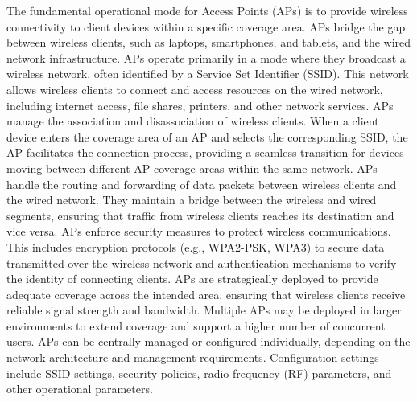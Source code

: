 \documentclass{article}
\begin{document}
	The fundamental operational mode for Access Points (APs) is to provide wireless connectivity to client devices within a specific coverage area. APs bridge the gap between wireless clients, such as laptops, smartphones, and tablets, and the wired network infrastructure. APs operate primarily in a mode where they broadcast a wireless network, often identified by a Service Set Identifier (SSID). This network allows wireless clients to connect and access resources on the wired network, including internet access, file shares, printers, and other network services. APs manage the association and disassociation of wireless clients. When a client device enters the coverage area of an AP and selects the corresponding SSID, the AP facilitates the connection process, providing a seamless transition for devices moving between different AP coverage areas within the same network. APs handle the routing and forwarding of data packets between wireless clients and the wired network. They maintain a bridge between the wireless and wired segments, ensuring that traffic from wireless clients reaches its destination and vice versa. APs enforce security measures to protect wireless communications. This includes encryption protocols (e.g., WPA2-PSK, WPA3) to secure data transmitted over the wireless network and authentication mechanisms to verify the identity of connecting clients. APs are strategically deployed to provide adequate coverage across the intended area, ensuring that wireless clients receive reliable signal strength and bandwidth. Multiple APs may be deployed in larger environments to extend coverage and support a higher number of concurrent users. APs can be centrally managed or configured individually, depending on the network architecture and management requirements. Configuration settings include SSID settings, security policies, radio frequency (RF) parameters, and other operational parameters.\\
\end{document}
